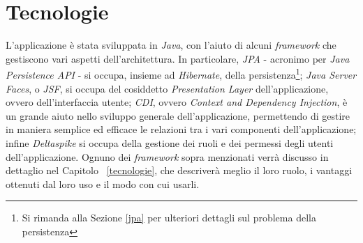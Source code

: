 \begin{comment}
\paragraph{Casi d'Uso}
Il diagramma dei Casi d'Uso descrive l'insieme delle funzionalità dell'applicazione, mettendo in evidenza come usarle e chi le usa. In questo modo, per esempio, si specifica che è un Operatore che si occupa dell'\textsl{Inserimento di una Convenzione/Contributo}, e non un Responsabile Scientifico.\newline
Il diagramma dei Casi d'Uso è una specifica di alto livello di ciò che l'applicazione deve fare, ed è per questo che è fondamentale per lo sviluppo iniziale di un'applicazione: gli sviluppatori e gli \textsl{Stakeholders} - chi ha interesse nello sviluppo dell'applicazione - si possono mettere d'accordo su cosa l'applicazione deve fare, e come lo deve fare, cioè come l'utente deve interagire con il sistema; spesso quest'ultimo punto viene specificato in termini di \textsl{Mockups}, ovvero di disegni che prototipizzino quella che diventerà l'interfaccia utente.
\end{comment}

\section{Tecnologie}
L'applicazione è stata sviluppata in \textsl{Java}, con l'aiuto di alcuni \textit{framework} che gestiscono vari aspetti dell'architettura. In particolare, \textsl{JPA} - acronimo per \textsl{Java Persistence API} - si occupa, insieme ad \textsl{Hibernate}, della persistenza\footnote{Si rimanda alla Sezione \ref{jpa} per ulteriori dettagli sul problema della persistenza}; \textsl{Java Server Faces}, o \textsl{JSF}, si occupa del cosiddetto \textsl{Presentation Layer} dell'applicazione, ovvero dell'interfaccia utente; \textsl{CDI}, ovvero \textsl{Context and Dependency Injection}, è un grande aiuto nello sviluppo generale dell'applicazione, permettendo di gestire in maniera semplice ed efficace le relazioni tra i vari componenti dell'applicazione; infine \textsl{Deltaspike} si occupa della gestione dei ruoli e dei permessi degli utenti dell'applicazione.\newline
Ognuno dei \textit{framework} sopra menzionati verrà discusso in dettaglio  nel Capitolo ~\ref{tecnologie}, che descriverà meglio il loro ruolo, i vantaggi ottenuti dal loro uso e il modo con cui usarli.

\begin{comment}
\section{Utilizzo}
Il Capitolo \ref{howto} spiega come si usa l'applicazione, descrivendo come utilizzare ognuna delle funzionalità dell'applicazione. In realtà, l'interfaccia di Jama non è complicata, ma è sempre bene far vedere in maniera esatta come si usa. Verranno inclusi \textit{screenshot} e spiegazioni dettagliate di ogni aspetto dell'applicazione: dalla creazione di una convenzione, alla sua modifica, alla visualizzazione, a tutte le altre funzionalità.
\end{comment}

